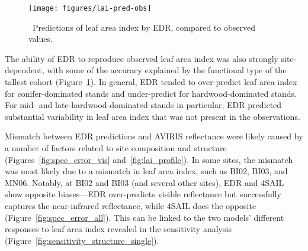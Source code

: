 
\begin{figure}
  \centering
  \texttt{[image: figures/lai-pred-obs]}
  \caption{\
    Predictions of leaf area index by EDR, compared to observed values.
  }\label{fig:lai-pred-obs}
\end{figure}

The ability of EDR to reproduce observed leaf area index was also strongly site-dependent, with some of the accuracy explained by the functional type of the tallest cohort (Figure~\ref{fig:lai-pred-obs}).
In general, EDR tended to over-predict leaf area index for conifer-dominated stands and under-predict for hardwood-dominated stands.
For mid- and late-hardwood-dominated stands in particular, EDR predicted substantial variability in leaf area index that was not present in the observations.


Mismatch between EDR predictions and AVIRIS reflectance were likely caused by a number of factors related to site composition and structure (Figures~\ref{fig:spec_error_vis} and~\ref{fig:lai_profile}).
In some sites, the mismatch was most likely due to a mismatch in leaf area index, such as BI02, BI03, and MN06.
Notably, at BI02 and BI03 (and several other sites), EDR and 4SAIL show opposite biases---EDR over-predicts visible reflectance but successfully captures the near-infrared reflectance, while 4SAIL does the opposite (Figure~\ref{fig:spec_error_all}).
This can be linked to the two models' different responses to leaf area index revealed in the sensitivity analysis (Figure~\ref{fig:sensitivity_structure_single}).

